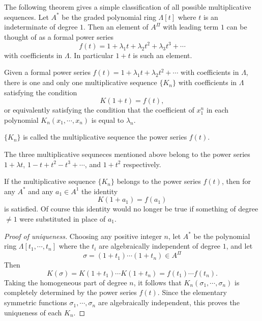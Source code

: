 \documentclass[../main]{subfiles}
\begin{document}
The following theorem gives a simple classification of all possible multiplicative sequences. Let $A^\ast$ be the graded polynomial ring $\Lambda[t]$ where $t$ is an indeterminate of degree $1$. Then an element of $A^\Pi$ with leading term $1$ can be thought of as a formal power series \[f(t) = 1+\lambda_1 t  + \lambda_2 t^2 + \lambda_3 t^3 + \cdots \] with coefficients in $\Lambda$. In particular $1+t$ is such an element. 
\begin{lemma}[Hirzebruch]
\label{lem:19.01}
Given a formal power series $f(t) = 1 + \lambda_1 t + \lambda_2 t^2 + \cdots$ with coefficients in $\Lambda$, there is one and only one multiplicative sequence $\{K_n\}$ with coefficients in $\Lambda$ satisfying the condition \[K(1+t) = f(t),\] or equivalently satisfying the condition that the coefficient of $x_1^n$ in each polynomial $K_n(x_1,\cdots,x_n)$ is equal to $\lambda_n$.
\end{lemma}
\begin{definition}
$\{K_n\}$ is called the multiplicative sequence  the power series $f(t)$.
\end{definition}
\begin{examples}
The three multiplicative sequneces mentioned above belong to the power series $1+ \lambda t$, $ 1-t + t^2 - t^3 + \cdots$, and $1+t^2$ respectively.
\end{examples}
\begin{remark*}
If the multiplicative sequence $\{K_n\}$ belongs to the power series $f(t)$, then for any $A^\ast$ and any $a_1 \in A^1$ the identity \[K(1+a_1) = f(a_1)\] is satisfied. Of course this identity would no longer be true if something of degree $\neq 1$ were substituted in place of $a_1$.
\end{remark*}
\begin{proof}[Proof of uniqueness]
Choosing any positive integer $n$, let $A^\ast$ be the polynomial ring $\Lambda[t_1,\cdots,t_n]$ where the $t_i$ are algebraically independent of degree $1$, and let \[ \sigma = (1+t_1)\cdots(1+t_n) \in A^\Pi\] Then \[K(\sigma) = K(1+t_1)\cdots K(1+t_n) = f(t_1)\cdots f(t_n).\] Taking the homogeneous part of degree $n$, it follows that $K_n(\sigma_1,\cdots,\sigma_n)$ is completely determined by the power series $f(t)$. Since the elementary symmetric functions $\sigma_1,\cdots,\sigma_n$ are algebraically independent, this proves the uniqueness of each $K_n$.
\end{proof}
\end{document}
